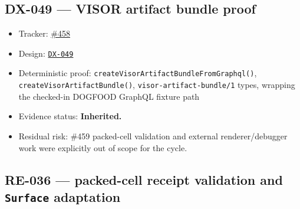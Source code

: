 \subsection{DX-049 --- VISOR artifact bundle proof}\label{record-262-dx-049-visor-artifact-bundle-proof}

\begin{itemize}
\tightlist
\item
  Tracker: \href{https://github.com/flyingrobots/bijou/issues/458}{\#458}
\item
  Design: \href{https://github.com/flyingrobots/bijou/blob/cbd70612140e7a450d764b3c7be1c6af878b99bc/docs/design/DX-049-visor-artifact-bundle-proof.md}{\texttt{D\allowbreak{}X\allowbreak{}-\allowbreak{}0\allowbreak{}4\allowbreak{}9}}
\item
  Deterministic proof: \texttt{c\allowbreak{}r\allowbreak{}e\allowbreak{}a\allowbreak{}t\allowbreak{}e\allowbreak{}V\allowbreak{}i\allowbreak{}s\allowbreak{}o\allowbreak{}r\allowbreak{}A\allowbreak{}r\allowbreak{}t\allowbreak{}i\allowbreak{}f\allowbreak{}a\allowbreak{}c\allowbreak{}t\allowbreak{}B\allowbreak{}u\allowbreak{}n\allowbreak{}d\allowbreak{}l\allowbreak{}e\allowbreak{}F\allowbreak{}r\allowbreak{}o\allowbreak{}m\allowbreak{}G\allowbreak{}r\allowbreak{}a\allowbreak{}p\allowbreak{}h\allowbreak{}q\allowbreak{}l\allowbreak{}(\allowbreak{})}, \texttt{c\allowbreak{}r\allowbreak{}e\allowbreak{}a\allowbreak{}t\allowbreak{}e\allowbreak{}V\allowbreak{}i\allowbreak{}s\allowbreak{}o\allowbreak{}r\allowbreak{}A\allowbreak{}r\allowbreak{}t\allowbreak{}i\allowbreak{}f\allowbreak{}a\allowbreak{}c\allowbreak{}t\allowbreak{}B\allowbreak{}u\allowbreak{}n\allowbreak{}d\allowbreak{}l\allowbreak{}e\allowbreak{}(\allowbreak{})}, \texttt{v\allowbreak{}i\allowbreak{}s\allowbreak{}o\allowbreak{}r\allowbreak{}-\allowbreak{}a\allowbreak{}r\allowbreak{}t\allowbreak{}i\allowbreak{}f\allowbreak{}a\allowbreak{}c\allowbreak{}t\allowbreak{}-\allowbreak{}b\allowbreak{}u\allowbreak{}n\allowbreak{}d\allowbreak{}l\allowbreak{}e\allowbreak{}/\allowbreak{}1} types, wrapping the checked-in DOGFOOD GraphQL fixture path
\item
  Evidence status: \textbf{Inherited.}
\item
  Residual risk: \#459 packed-cell validation and external renderer/debugger work were explicitly out of scope for the cycle.
\end{itemize}

\subsection{\texorpdfstring{RE-036 --- packed-cell receipt validation and \texttt{S\allowbreak{}u\allowbreak{}r\allowbreak{}f\allowbreak{}a\allowbreak{}c\allowbreak{}e} adaptation}{RE-036 --- packed-cell receipt validation and  adaptation}}\label{record-262-re-036-packed-cell-receipt-validation-and-surface-adaptation}

